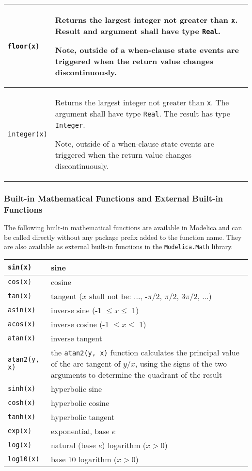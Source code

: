 \begin{longtable}{|p{2cm}|p{12cm}|}
\lstinline!floor(x)! & Returns the largest integer not greater than \lstinline!x!. Result and
argument shall have type \lstinline!Real!.
\par
\begin{nonnormative*}
Note, outside of a when-clause state events are triggered when the return value changes discontinuously.
\end{nonnormative*}
\\ \hline
\lstinline!integer(x)! & Returns the largest integer not greater
than \lstinline!x!. The argument shall have type \lstinline!Real!. The result has type
\lstinline!Integer!.
\par
\begin{nonnormative*}
Note, outside of a when-clause state events are triggered when the return value changes discontinuously.
\end{nonnormative*}
\\ \hline
\end{longtable}

\subsubsection{Built-in Mathematical Functions and External Built-in Functions}\label{built-in-mathematical-functions-and-external-built-in-functions}

The following built-in mathematical functions are available in Modelica
and can be called directly without any package prefix added to the
function name. They are also available as external built-in functions in
the \lstinline!Modelica.Math! library.

\begin{longtable}{|l|p{8cm}|}
\hline \endhead
\lstinline!sin(x)! & sine\\ \hline
\lstinline!cos(x)! & cosine\\ \hline
\lstinline!tan(x)! & tangent ($x$ shall not be: ..., -$\pi$/2, $\pi$/2, 3$\pi$/2, ...)\\ \hline
\lstinline!asin(x)! & inverse sine (-1 $\le x \le$ 1)\\ \hline
\lstinline!acos(x)! & inverse cosine (-1 $\le x \le$ 1)\\ \hline
\lstinline!atan(x)! & inverse tangent\\ \hline
\lstinline!atan2(y, x)! & the \lstinline!atan2(y, x)! function calculates the principal value of the arc tangent of $y/x$, using the signs of the two arguments to determine the quadrant of the result\\ \hline
\lstinline!sinh(x)! & hyperbolic sine\\ \hline
\lstinline!cosh(x)! & hyperbolic cosine\\ \hline
\lstinline!tanh(x)! & hyperbolic tangent\\ \hline
\lstinline!exp(x)! & exponential, base $e$\\ \hline
\lstinline!log(x)! & natural (base $e$) logarithm ($x > 0$)\\ \hline
\lstinline!log10(x)! & base 10 logarithm ($x > 0$)\\ \hline
\end{longtable}

